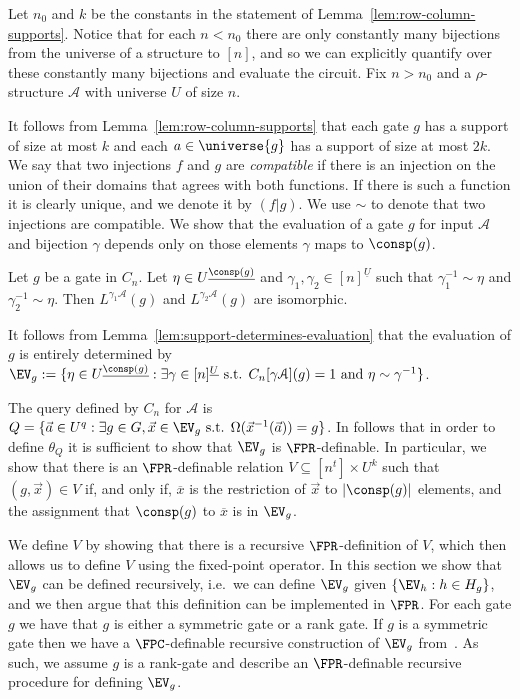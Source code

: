 \documentclass[a4paper,UKenglish]{lipics-v2018}
\begin{document}
Let $n_0$ and $k$ be the constants in the statement of
Lemma~\ref{lem:row-column-supports}. Notice that for each $n < n_0$ there are
only constantly many bijections from the universe of a structure to $[n]$, and
so we can explicitly quantify over these constantly many bijections and evaluate
the circuit. Fix $n > n_0$ and a $\rho$-structure $\mathcal{A}$ with universe
$U$ of size $n$.

It follows from Lemma~\ref{lem:row-column-supports} that each gate $g$ has a
support of size at most $k$ and each $a \in \universe{g}$ has a
support of size at most $2k$. We say that two injections $f$ and $g$ are \emph{compatible} if there
is an injection on the union of their domains that agrees with both functions.
If there is such a function it is clearly unique, and we denote it by $(f \vert
g)$. We use $\sim$ to denote that two injections are compatible. We show that
the evaluation of a gate $g$ for input $\mathcal{A}$ and bijection $\gamma$
depends only on those elements $\gamma$ maps to $\consp(g)$.

\begin{lemma}
	Let $g$ be a gate in $C_n$. Let $\eta \in U^{\underline{\consp(g)}}$ and
  $\gamma_1, \gamma_2 \in [n]^{\underline{U}}$ such that $\gamma^{-1}_1 \sim
  \eta$ and $\gamma^{-1}_2 \sim \eta$. Then $L^{\gamma_1 \mathcal{A}}(g)$ and
  $L^{\gamma_2 \mathcal{A}}(g)$ are isomorphic.
	\label{lem:support-determines-evaluation}
\end{lemma}

It follows from Lemma~\ref{lem:support-determines-evaluation} that the
evaluation of $g$ is entirely determined by $\EV_g := \{ \eta \in
U^{\underline{\consp(g)}} : \exists \gamma \in [n]^{\underline{U}}\text{ s.t. }
C_n[\gamma \mathcal{A}](g) = 1 \text{ and } \eta \sim \gamma^{-1}\}$.

The query defined by $C_n$ for $\mathcal{A}$ is $Q = \{ \vec{a} \in U^{q} :
\exists g \in G , \vec{x} \in \EV_g \text{ s.t. } \Omega(\vec{x}^{-1}(\vec{a}))
= g\}$. In follows that in order to define $\theta_Q$ it is sufficient to show
that $\EV_g$ is $\FPR$-definable. In particular, we show that there is an
$\FPR$-definable relation $V \subseteq [n^t] \times U^k$ such that $(g, \vec{x})
\in V$ if, and only if, $\overline{x}$ is the restriction of $\vec{x}$ to $\vert
\consp(g) \vert$ elements, and the assignment that $\consp(g)$ to $\overline{x}$
is in $\EV_g$.

We define $V$ by showing that there is a recursive $\FPR$-definition of $V$,
which then allows us to define $V$ using the fixed-point operator. In this
section we show that $\EV_g$ can be defined recursively, i.e.\ we can define
$\EV_g$ given $\{\EV_h : h \in H_g \}$, and we then argue that this definition
can be implemented in $\FPR$. For each gate $g$ we have that $g$ is either a
symmetric gate or a rank gate. If $g$ is a symmetric gate then we have a
$\FPC$-definable recursive construction of $\EV_g$ from~\cite{AndersonD17}. As
such, we assume $g$ is a rank-gate and describe an $\FPR$-definable recursive
procedure for defining $\EV_g$.
\end{document}
